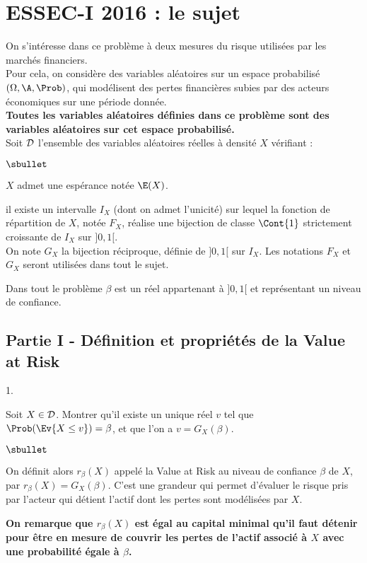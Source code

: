 \chapter*{ESSEC-I 2016 : le sujet}
  
%

\noindent
On s'intéresse dans ce problème à deux mesures du risque utilisées 
par les marchés financiers.\\
Pour cela, on considère des variables aléatoires sur un espace 
probabilisé $(\Omega,\A,\Prob)$, qui modélisent des pertes 
financières subies par des acteurs économiques sur une période donnée.\\
{\bf Toutes les variables aléatoires définies dans ce problème 
sont des variables aléatoires sur cet espace probabilisé.}\\
Soit ${\cal D}$ l'ensemble des variables aléatoires réelles à 
densité $X$ vérifiant :
\begin{noliste}{$\sbullet$}
  \item $X$ admet une espérance notée $\E(X)$.
  \item il existe un intervalle $I_X$ (dont on admet 
  l'unicité) sur lequel la fonction de répartition de $X$, notée 
  $F_X$, réalise une bijection de classe $\Cont{1}$ strictement 
  croissante de $I_X$ sur $]0,1[$.\\
  On note $G_X$ la bijection réciproque, définie de $]0,1[$ sur 
  $I_X$. Les notations $F_X$ et $G_X$ seront utilisées dans tout 
  le sujet.
\end{noliste}
Dans tout le problème $\beta$ est un réel appartenant à $]0,1[$ et 
représentant un niveau de confiance.

\section*{Partie I - Définition et propriétés de la \og Value at 
Risk \fg}

\begin{noliste}{1.}
  \setlength{\itemsep}{4mm}
  \item Soit $X \in {\cal D}$. Montrer qu'il existe un unique réel 
  $v$ tel que $\Prob(\Ev{X \leq v})=\beta$, et que l'on a 
  $v=G_X(\beta)$.
  
  

\end{noliste}

\begin{noliste}{$\sbullet$}
  \item On définit alors $r_\beta(X)$ appelé la \og Value at 
  Risk \fg au niveau de confiance $\beta$ de $X$, par 
  $r_\beta(X)=G_X(\beta)$. C'est une grandeur qui permet d'évaluer 
  le risque pris par l'acteur qui détient l'actif dont les pertes 
  sont modélisées par $X$.
  
  \item {\bf On remarque que $r_\beta(X)$ est égal au 
  capital minimal qu'il faut détenir pour être en mesure de 
  couvrir les pertes de l'actif associé à $X$ avec une probabilité 
  égale à $\beta$.}
\end{noliste}

